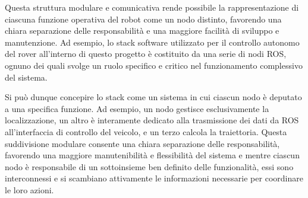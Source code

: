 \noindent Questa struttura modulare e comunicativa rende possibile la rappresentazione di ciascuna funzione operativa del robot come un nodo distinto, favorendo una chiara separazione delle responsabilità e una maggiore facilità di sviluppo e manutenzione. Ad esempio, lo stack software utilizzato per il controllo autonomo del rover all'interno di questo progetto è costituito da una serie di nodi ROS, ognuno dei quali svolge un ruolo specifico e critico nel funzionamento complessivo del sistema.

\noindent Si può dunque concepire lo stack come un sistema in cui ciascun nodo è deputato a una specifica funzione. Ad esempio, un nodo gestisce esclusivamente la localizzazione, un altro è interamente dedicato alla trasmissione dei dati da ROS all'interfaccia di controllo del veicolo, e un terzo calcola la traiettoria. Questa suddivisione modulare consente una chiara separazione delle responsabilità, favorendo una maggiore manutenibilità e flessibilità del sistema e mentre ciascun nodo è responsabile di un sottoinsieme ben definito delle funzionalità, essi sono interconnessi e si scambiano attivamente le informazioni necessarie per coordinare le loro azioni.

